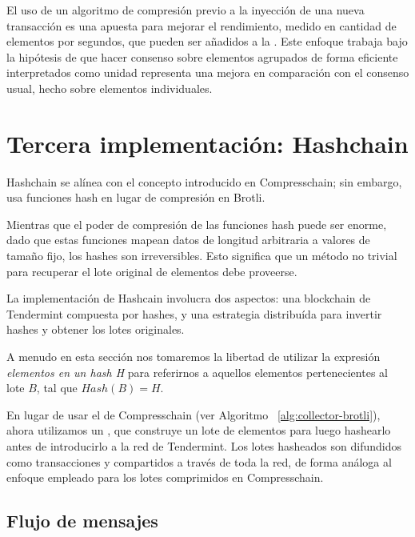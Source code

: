 %

El uso de un algoritmo de compresión previo a la inyección de una nueva transacción es una apuesta para mejorar
el rendimiento, medido en cantidad de elementos por segundos, que pueden ser añadidos a la \setchain.
Este enfoque trabaja bajo la hipótesis
de que hacer consenso sobre elementos agrupados de forma eficiente interpretados como unidad representa una
mejora en comparación con el consenso usual, hecho sobre elementos individuales.

\section{Tercera implementación: Hashchain}\label{sec:hashchain}
%
Hashchain se alínea con el concepto introducido en Compresschain; sin embargo, usa
funciones hash en lugar de compresión en Brotli.

%
Mientras que el poder de compresión de las funciones hash puede ser enorme, dado que estas funciones
mapean datos de longitud arbitraria a valores de tamaño fijo, los hashes son irreversibles. Esto
significa que un método no trivial para recuperar el lote original de elementos debe proveerse.

La implementación de Hashcain involucra dos aspectos: una blockchain de Tendermint compuesta por hashes,
y una estrategia distribuída para invertir hashes y obtener los lotes originales.
%

A menudo en esta sección nos tomaremos la libertad de utilizar la expresión \textit{elementos en un hash H}
para referirnos a aquellos elementos pertenecientes al lote $B$, tal que $Hash(B) = H$.

En lugar de usar el \collector de Compresschain (ver Algoritmo ~\ref{alg:collector-brotli}),
ahora utilizamos un \hcollector, que construye un lote de elementos para luego hashearlo
antes de introducirlo a la red de Tendermint.
%
Los lotes hasheados son difundidos como transacciones y compartidos a través de toda la red, de forma
análoga al enfoque empleado para los lotes comprimidos en Compresschain.

\subsection{Flujo de mensajes}

